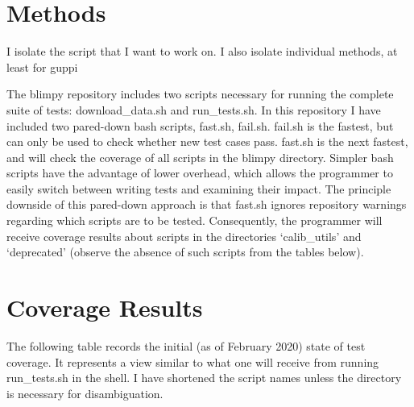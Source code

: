\documentclass[12pt]{article}
\begin{document}
\section{Methods}

\quad \quad I isolate the script that I want to work on. I also isolate individual methods, at least for guppi

The blimpy repository includes two scripts necessary for running the complete suite of tests: download\_data.sh and run\_tests.sh. In this repository I have included two pared-down bash scripts, fast.sh, fail.sh. fail.sh is the fastest, but can only be used to check whether new test cases pass. fast.sh is the next fastest, and will check the coverage of all scripts in the blimpy directory. Simpler bash scripts have the advantage of lower overhead, which allows the programmer to easily switch between writing tests and examining their impact. The principle downside of this pared-down approach is that fast.sh ignores repository warnings regarding which scripts are to be tested. Consequently, the programmer will receive coverage results about scripts in the directories `calib\_utils' and `deprecated' (observe the absence of such scripts from the tables below). 

\section{Coverage Results}

\quad \quad The following table records the initial (as of February 2020) state of test coverage. It represents a view similar to what one will receive from running run\_tests.sh in the shell. I have shortened the script names unless the directory is necessary for disambiguation.
\end{document}
